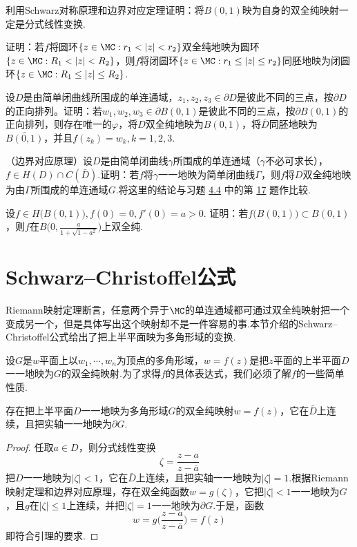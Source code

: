 \begin{xiti}\hypertarget{xiti7.3}{}
\item 利用Schwarz对称原理和边界对应定理证明：将$B(0,1)$映为自身的双全纯映射一定是分式线性变换.
\item \hypertarget{xiti7.3.2}{} 证明：若$f$将圆环$\{z\in\MC:r_1<|z|<r_2\}$双全纯地映为圆环
$\{z\in\MC:R_1<|z|<R_2\}$，则$f$将闭圆环$\{z\in\MC:r_1\le|z|\le r_2\}$同胚地映为闭圆环$\{z\in\MC:R_1\le|z|\le R_2\}$.
\item 设$D$是由简单闭曲线所围成的单连通域，$z_1,z_2,z_3\in\partial D$是彼此不同的三点，按$\partial D$的正向排列。证明：若$w_1,w_2,w_3\in\partial B(0,1)$是彼此不同的三点，按$\partial B(0,1)$的正向排列，则存在唯一的$\varphi$，将$D$双全纯地映为$B(0,1)$，将$\bar D$同胚地映为$\bar{B(0,1)}$，并且$f(z_k)=w_k,k=1,2,3$.
\item （边界对应原理）设$D$是由简单闭曲线$\gamma$所围成的单连通域（$\gamma$不必可求长），$f\in H(D)\cap C(\bar D)$.证明：若$f$将$\gamma$一一地映为简单闭曲线$\Gamma$，则$f$将$D$双全纯地映为由$\Gamma$所围成的单连通域$G$.将这里的结论与习题 \hyperlink{xiti4.4}{4.4} 中的第
     \hyperlink{xiti4.4.17}{17} 题作比较.
\item 设$f\in H\big(B(0,1)\big),f(0)=0,f'(0)=a>0$. 证明：若$f\big(B(0,1)\big)\subset B(0,1)$，则$f$在$B\bigg(0,\frac a{1+\sqrt{1-a^2}}\bigg)$上双全纯.
\end{xiti}

\section{Schwarz--Christoffel公式\label{sec7.4}}
Riemann映射定理断言，任意两个异于$\MC$的单连通域都可通过双全纯映射把一个变成另一个，但是具体写出这个映射却不是一件容易的事.本节介绍的Schwarz--Christoffel公式给出了把上半平面映为多角形域的变换.

设$G$是$w$平面上以$w_1,\cdots,w_n$为顶点的多角形域，$w=f(z)$是把$z$平面的上半平面$D$一一地映为$G$的双全纯映射.为了求得$f$的具体表达式，我们必须了解$f$的一些简单性质.
\begin{lemma}\label{lemma7.4.1}
  存在把上半平面$D$一一地映为多角形域$G$的双全纯映射$w=f(z)$，它在$\bar D$上连续，且把实轴一一地映为$ \partial G$.
\end{lemma}
\begin{proof}
任取$a\in D$，则分式线性变换
\[\zeta=\frac{z-a}{z-\bar a}\]
把$D$一一地映为$|\zeta|<1$，它在$\bar D$上连续，且把实轴一一地映为$|\zeta|=1$.根据Riemann映射定理和边界对应原理，存在双全纯函数$w=g(\zeta)$，它把$|\zeta|<1$一一地映为$G$，且$g$在$|\zeta|\le1$上连续，并把$|\zeta|=1$一一地映为$\partial G$.于是，函数
\[w=g\bigg(\frac{z-a}{z-\bar a}\bigg)=f(z)\]
即符合引理的要求.
\end{proof}

